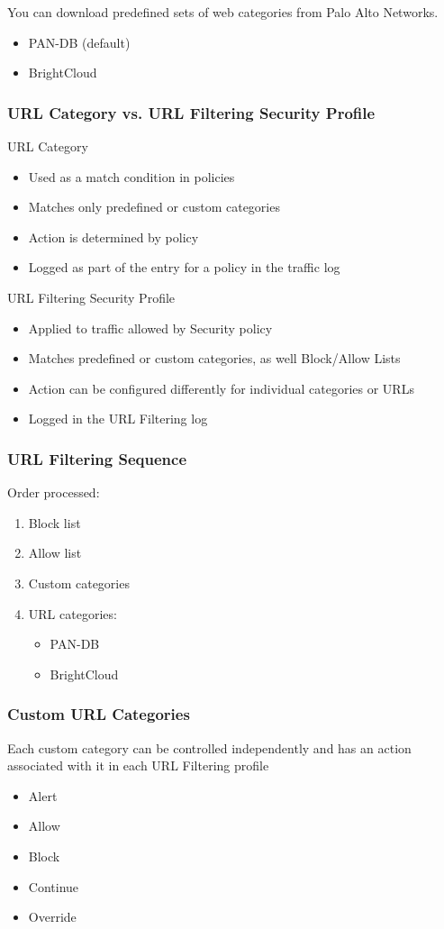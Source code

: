 You can download predefined sets of web categories from Palo Alto Networks. 
	\begin{itemize}
		\item PAN-DB (default)
		\item BrightCloud
	\end{itemize}

\subsubsection{URL Category vs. URL Filtering Security Profile}
URL Category	
	\begin{itemize}
		\item Used as a match condition in policies
		\item Matches only predefined or custom categories
		\item Action is determined by policy
		\item Logged as part of the entry for a policy in the traffic log
	\end{itemize}
URL Filtering Security Profile
	\begin{itemize}
		\item Applied to traffic allowed by Security policy
		\item Matches predefined or custom categories, as well Block/Allow Lists
		\item Action can be configured differently for individual categories or URLs
		\item Logged in the URL Filtering log
	\end{itemize}
	
\subsubsection{URL Filtering Sequence}
Order processed:
    \begin{enumerate}
        \item Block list
        \item Allow list
        \item Custom categories
        \item URL categories:
            \begin{itemize}
                \item PAN-DB
                \item BrightCloud
            \end{itemize}
    \end{enumerate}

\subsubsection{Custom URL Categories}
Each custom category can be controlled independently and has an action associated with it in each URL Filtering profile
    \begin{itemize}
        \item Alert
        \item Allow
        \item Block
        \item Continue
        \item Override
    \end{itemize}

